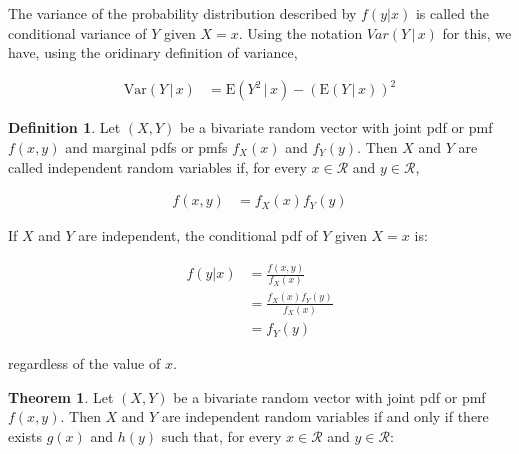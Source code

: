 \documentclass[11pt,a4paper]{report}
\theoremstyle{definition}
\newtheorem{defn}{Definition}[section]
\theoremstyle{theorem}
\newtheorem{thm}{Theorem}[section]
\begin{document}
The variance of the probability distribution described by $f(y|x)$ is called the conditional variance of $Y$ given $X = x$.  Using the notation $Var(Y \, | \, x)$ for this, we have, using the oridinary definition of variance,

\begin{align*}
  \mathrm{Var}(Y \, | \, x) &= \mathrm{E}(Y^2 \, | \, x) - (\mathrm{E}(Y \, | \, x))^2
\end{align*}

\begin{defn}
  Let $(X, Y)$ be a bivariate random vector with joint pdf or pmf $f(x,y)$ and marginal pdfs or pmfs $f_X(x)$ and $f_Y(y)$.  Then $X$ and $Y$ are called independent random variables if, for every $x \in \mathcal{R}$ and $y \in \mathcal{R}$,

  \begin{align*}
    f(x,y) &= f_X(x) f_Y(y)
  \end{align*}

  If $X$ and $Y$ are independent, the conditional pdf of $Y$ given $X = x$ is:

  \begin{align*}
    f(y|x) &= \frac{f(x,y)}{f_X(x)} \\
    &= \frac{f_X(x) f_Y(y)}{f_X(x)} \\
    &= f_Y(y)
  \end{align*}

  regardless of the value of $x$.
\end{defn}

\begin{thm}
  Let $(X,Y)$ be a bivariate random vector with joint pdf or pmf $f(x,y)$.  Then $X$ and $Y$ are independent random variables if and only if there exists $g(x)$ and $h(y)$ such that, for every $x \in \mathcal{R}$ and $y \in \mathcal{R}$:
\end{thm}
\end{document}
